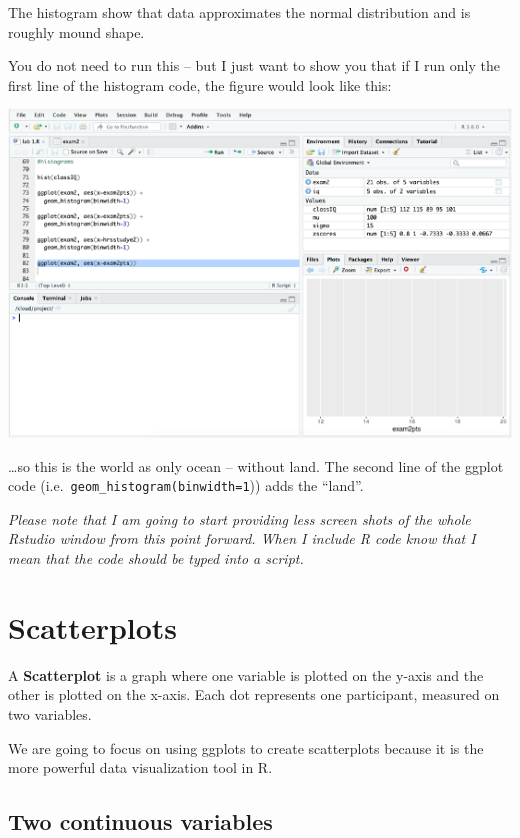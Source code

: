 \documentclass[
]{book}
\begin{document}
The histogram show that data approximates the normal distribution and is roughly mound shape.

You do not need to run this -- but I just want to show you that if I run only the first line of the histogram code, the figure would look like this:

\includegraphics{img/ggoc.png}

\ldots so this is the world as only ocean -- without land. The second line of the ggplot code (i.e.~\texttt{geom\_histogram(binwidth=1})) adds the ``land''.

\emph{Please note that I am going to start providing less screen shots of the whole Rstudio window from this point forward. When I include R code know that I mean that the code should be typed into a script.}

\hypertarget{scatterplots}{%
\section{Scatterplots}\label{scatterplots}}

A \textbf{Scatterplot} is a graph where one variable is plotted on the y-axis and the other is plotted on the x-axis. Each dot represents one participant, measured on two variables.

We are going to focus on using ggplots to create scatterplots because it is the more powerful data visualization tool in R.

\hypertarget{two-continuous-variables}{%
\subsection{Two continuous variables}\label{two-continuous-variables}}
\end{document}
